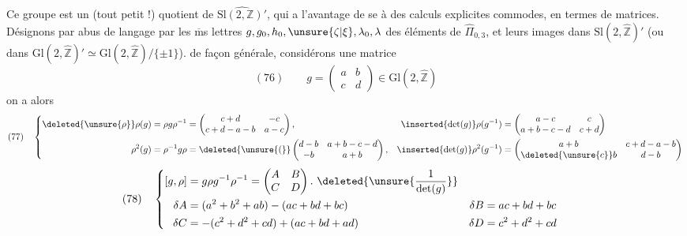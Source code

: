 Ce groupe est un (tout petit !) quotient de $\widehat{\mathrm{Sl}(2,\mathbb Z)'}$, qui a l'avantage de se  à des calculs  explicites commodes, en termes de matrices. Désignons par abus de langage par les $\overline{\mathrm m}$s lettres $g,g_0,h_0,\unsure{\zeta|\xi},\lambda_0,\lambda$ des éléments de  $\widehat{\Pi}_{0,3}$,  et leurs images dans  $\mathrm{Sl}(2,\widehat{\mathbb Z})'$  (ou dans $\mathrm{Gl}(2,\widehat{\mathbb Z})'\simeq\mathrm{Gl}(2,\widehat{\mathbb Z})/\{\pm1\}$).   de façon générale, considérons une matrice
\[
(76)\qquad g=\begin{pmatrix}a&b\\c&d\end{pmatrix}\in\mathrm{Gl}(2,\widehat{\mathbb Z})
\]
on a alors
\[
(77)\quad
\left\{\begin{aligned}
\deleted{\unsure{\rho}}\rho(g)&=\rho g\rho^{-1}=\begin{pmatrix}c+d&-c\\c+d-a-b&a-c\end{pmatrix},
&\inserted{\det(g)}\rho(g^{-1})&=\begin{pmatrix}a-c&c\\a+b-c-d&c+d\end{pmatrix}\\
\rho^2(g)&=\rho^{-1}g\rho=\deleted{\unsure{(}}\begin{pmatrix}d-b&a+b-c-d\\-b&a+b\end{pmatrix},
&\inserted{\det(g)}\rho^2(g^{-1})&=\begin{pmatrix}a+b&c+d-a-b\\\deleted{\unsure{c}}b&d-b\end{pmatrix}
\end{aligned}\right.
\]
\[
(78)\quad
\left\{\begin{aligned}
\relax[g,\rho]&=g\rho g^{-1}\rho^{-1}=\begin{pmatrix}A&B\\C&D\end{pmatrix}.\ \deleted{\unsure{\frac{1}{\det(g)}}}\\
\delta A&=(a^2+b^2+ab)-(ac+bd+bc)&\delta B&=ac+bd+bc\\
\delta C&=-(c^2+d^2+cd)+(ac+bd+ad)&\delta D&=c^2+d^2+cd
\end{aligned}\right.
\]

